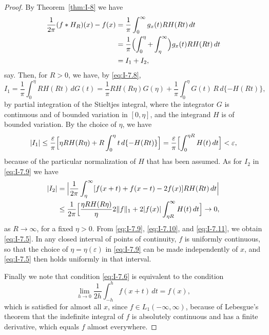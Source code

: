 \begin{proof}
By Theorem~\ref{thm:I-8} we have
\begin{equation}\label{eq:I-7.9}
\begin{aligned}
\frac{1}{2\pi}(f*H_R)(x)-f(x) &= \frac{1}{\pi}\int_0^\infty g_x(t)RH(Rt)\,dt\\
&= \frac{1}{\pi}\Bigl(\int_0^\eta+\int_\eta^\infty\Bigr)g_x(t)RH(Rt)\,dt\\
&= I_1+I_2,
\end{aligned}
\end{equation}
say. Then, for $R>0$, we have, by \eqref{eq:I-7.8},
\begin{equation*}
I_1=\frac{1}{\pi}\int_0^\eta RH(Rt)\,dG(t)
=\frac{1}{\pi}RH(R\eta)G(\eta)+\frac{1}{\pi}\int_0^\eta G(t)\,R\,d\{-H(Rt)\},
\end{equation*}
by partial integration of the Stieltjes integral, where the integrator $G$ is continuous and of bounded variation in $[0,\eta]$, and the integrand $H$ is of bounded variation. By the choice of $\eta$, we have
\begin{equation}\label{eq:I-7.10}
|I_1|\le\frac{\varepsilon}{\pi}\Bigl[\eta RH(R\eta)+R\int_0^\eta t\,d\{-H(Rt)\}\Bigr]
=\frac{\varepsilon}{\pi}\Bigl[\int_0^{\eta R}H(t)\,dt\Bigr]<\varepsilon,
\end{equation}
because of the particular normalization of $H$ that has been assumed. As for $I_2$ in \eqref{eq:I-7.9} we have
\begin{equation}\label{eq:I-7.11}
\begin{aligned}
|I_2| &= \Bigl|\frac{1}{2\pi}\int_\eta^\infty[f(x+t)+f(x-t)-2f(x)]RH(Rt)\,dt\Bigr|\\
&\le \frac{1}{2\pi}\Bigl[\frac{\eta RH(R\eta)}{\eta}2\|f\|_1+2|f(x)|\int_{\eta R}^\infty H(t)\,dt\Bigr]\to 0,
\end{aligned}
\end{equation}
as $R\to\infty$, for a fixed $\eta>0$. From \eqref{eq:I-7.9}, \eqref{eq:I-7.10}, and \eqref{eq:I-7.11}, we obtain \eqref{eq:I-7.5}. In any closed interval of points of continuity, $f$ is uniformly continuous, so that the choice of $\eta=\eta(\varepsilon)$ in \eqref{eq:I-7.9} can be made independently of $x$, and \eqref{eq:I-7.5} then holds uniformly in that interval.

Finally we note that condition \eqref{eq:I-7.6} is equivalent to the condition
\begin{equation*}
\lim_{h\to 0}\frac{1}{2h}\int_{-h}^{h}f(x+t)\,dt=f(x),
\end{equation*}
which is satisfied for almost all $x$, since $f\in L_1(-\infty,\infty)$, because of Lebesgue's theorem that the indefinite integral of $f$ is absolutely continuous and has a finite derivative, which equals $f$ almost everywhere.
\end{proof}

